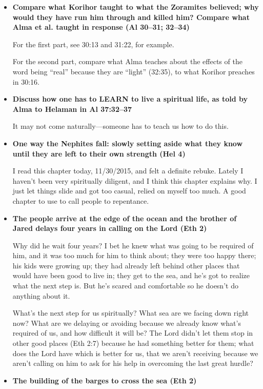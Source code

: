 \begin{itemize}
\item \textbf{Compare what Korihor taught to what the Zoramites believed; why would they have run him through and killed him? Compare what Alma et al. taught in response (Al 30--31; 32--34)}

	For the first part, see 30:13 and 31:22, for example.
	
	For the second part, compare what Alma teaches about the effects of the word being ``real'' because they are ``light'' (32:35), to what Korihor preaches in 30:16.
	
\item \textbf{Discuss how one has to LEARN to live a spiritual life, as told by Alma to Helaman in Al 37:32--37}

	It may not come naturally---someone has to teach us how to do this.
	
\item \textbf{One way the Nephites fall: slowly setting aside what they know until they are left to their own strength (Hel 4)} 

	I read this chapter today, 11/30/2015, and felt a definite rebuke. Lately I haven't been very spiritually diligent, and I think this chapter explains why. I just let things slide and got too casual, relied on myself too much. A good chapter to use to call people to repentance.
	
\item \textbf{The people arrive at the edge of the ocean and the brother of Jared delays four years in calling on the Lord (Eth 2)} 

	Why did he wait four years? I bet he knew what was going to be required of him, and it was too much for him to think about; they were too happy there; his kids were growing up; they had already left behind other places that would have been good to live in; they get to the sea, and he's got to realize what the next step is. But he's scared and comfortable so he doesn't do anything about it. 
	
	What's the next step for us spiritually? What sea are we facing down right now? What are we delaying or avoiding because we already know what's required of us, and how difficult it will be? The Lord didn't let them stop in other good places (Eth 2:7) because he had something better for them; what does the Lord have which is better for us, that we aren't receiving because we aren't calling on him to ask for his help in overcoming the last great hurdle? 
	
\item \textbf{The building of the barges to cross the sea (Eth 2)}


\end{itemize}
